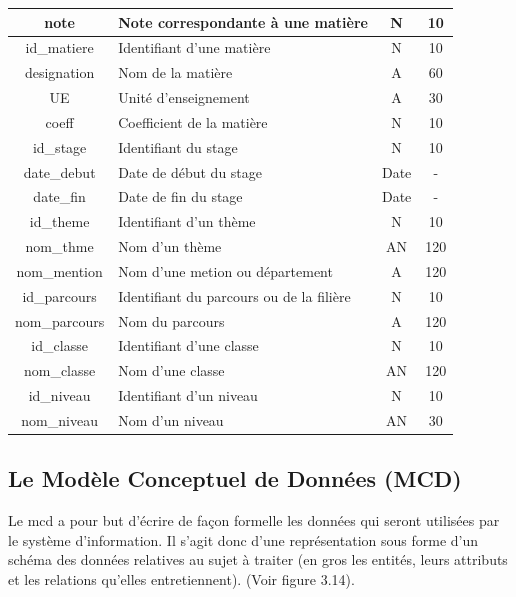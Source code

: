 \begin{center}
{\begin{longtable}{|c|>{\centering}m{7cm}|c|c|}
				\hline note & Note correspondante à une matière & N & 10 \\
				
				\hline id\_matiere & Identifiant d'une matière & N & 10 \\
				\hline designation & Nom de la matière & A & 60 \\
				\hline UE & Unité d'enseignement & A & 30 \\
				\hline coeff & Coefficient de la matière & N & 10 \\
				
				\hline id\_stage & Identifiant du stage & N & 10 \\
				\hline date\_debut & Date de début du stage & Date & - \\
				\hline date\_fin & Date de fin du stage & Date & - \\
				
				\hline id\_theme & Identifiant d'un thème & N & 10 \\
				\hline nom\_thme & Nom d'un thème & AN & 120 \\
				
				\hline nom\_mention & Nom d'une metion ou département & A & 120 \\
				
				\hline id\_parcours & Identifiant du parcours ou de la filière & N & 10 \\
				\hline nom\_parcours & Nom du parcours & A & 120 \\
				
				\hline id\_classe & Identifiant d'une classe & N & 10 \\
				\hline nom\_classe & Nom d'une classe & AN & 120 \\
				
				\hline id\_niveau & Identifiant d'un niveau & N & 10 \\
				\hline nom\_niveau & Nom d'un niveau & AN & 30 \\
				
				\hline
				
			\end{longtable} 
	} \quad
\end{center}

\subsection{Le Modèle Conceptuel de Données (MCD)}
Le \gls{mcd} a pour but d'écrire de façon formelle les données
qui seront utilisées par le système d'information. Il s'agit donc d’une représentation sous forme d'un schéma des données relatives au sujet à traiter (en gros les entités, leurs attributs et les relations qu'elles entretiennent). (Voir figure 3.14).


